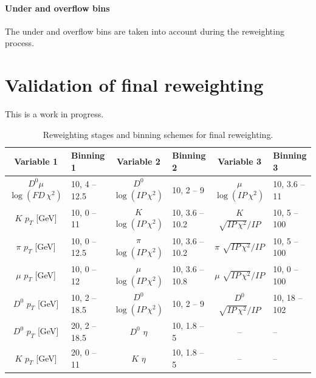\paragraph{Under and overflow bins}
The under and overflow bins are taken into account during
the reweighting process.



\section{Validation of final reweighting}

This is a work in progress.


\begin{landscape}
\begin{table}[p]
    \centering
    \caption{
        Reweighting stages and binning schemes for final reweighting.
    }
    \label{tab:rwt-final-vars}
    \begin{tabular}{c|l|c|l|c|l}
        \toprule
         {\bf Variable 1}             & {\bf Binning 1}   & {\bf Variable 2}               & {\bf Binning 2}   & {\bf Variable 3}                     & {\bf Binning 3}   \\
        \midrule
         $D^0\mu$ $\log(FD\, \chi^2)$ & 10, 4 -- 12.5     & $D^0$ $\log(IP\, \chi^2)$      & 10, 2 -- 9        & $\mu$ $\log(IP\, \chi^2)$            & 10, 3.6 -- 11     \\
         $K$ $p_T$ [GeV]              & 10, 0 -- 11       & $K$ $\log(IP\, \chi^2)$        & 10, 3.6 -- 10.2   & $K$ $\sqrt{IP\, \chi^2} / IP$        & 10, 5 -- 100      \\
         $\pi$ $p_T$ [GeV]            & 10, 0 -- 12.5     & $\pi$ $\log(IP\, \chi^2)$      & 10, 3.6 -- 10.2   & $\pi$ $\sqrt{IP\, \chi^2} / IP$      & 10, 5 -- 100      \\
         $\mu$ $p_T$ [GeV]            & 10, 0 -- 12       & $\mu$ $\log(IP\, \chi^2)$      & 10, 3.6 -- 10.8   & $\mu$ $\sqrt{IP\, \chi^2} / IP$      & 10, 0 -- 100      \\
         $D^0$ $p_T$ [GeV]            & 10, 2 -- 18.5     & $D^0$ $\log(IP\, \chi^2)$      & 10, 2 -- 9        & $D^0$ $\sqrt{IP\, \chi^2} / IP$      & 10, 18 -- 102     \\
         $D^0$ $p_T$ [GeV]            & 20, 2 -- 18.5     & $D^0$ $\eta$                   & 10, 1.8 -- 5      & --                                   & --                \\
         $K$ $p_T$ [GeV]              & 20, 0 -- 11       & $K$ $\eta$                     & 10, 1.8 -- 5      & --                                   & --                \\

\end{tabular}
\end{table}
\end{landscape}
